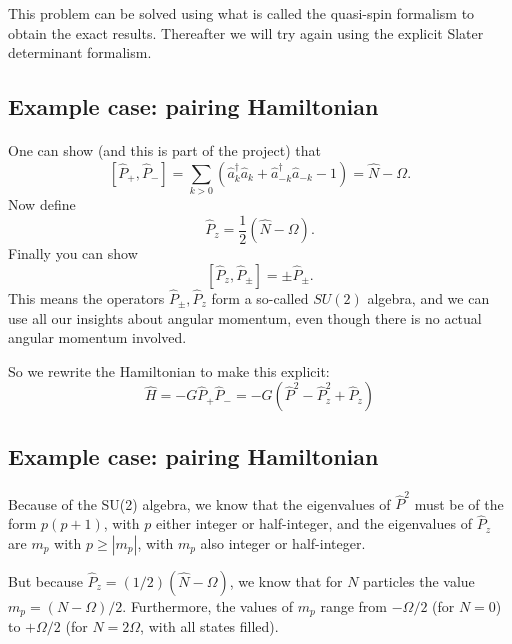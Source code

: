 This problem can be solved using what is called the quasi-spin formalism to obtain the 
exact results. Thereafter we will try again using the explicit Slater determinant formalism.



\subsection*{Example case: pairing Hamiltonian}

\paragraph{}

One can show (and this is part of the project) that
\[
\left [ \hat{P}_+, \hat{P}_- \right ] = \sum_{k> 0} \left( \hat{a}^\dagger_k \hat{a}_k 
+ \hat{a}^\dagger_{-{k}} \hat{a}_{-{k}} - 1 \right) = \hat{N} - \Omega.
\]
Now define 
\[
\hat{P}_z = \frac{1}{2} ( \hat{N} -\Omega).
\]
Finally you can show
\[
\left [ \hat{P}_z , \hat{P}_\pm \right ] = \pm \hat{P}_\pm.
\]
This means the operators $\hat{P}_\pm, \hat{P}_z$ form a so-called  $SU(2)$ algebra, and we can 
use all our insights about angular momentum, even though there is no actual 
angular momentum involved.

So we rewrite the Hamiltonian to make this explicit:
\[
\hat{H} = -G \hat{P}_+ \hat{P}_- 
= -G \left( \hat{P}^2 - \hat{P}_z^2 + \hat{P}_z\right)
\]



\subsection*{Example case: pairing Hamiltonian}

\paragraph{}

Because of the SU(2) algebra, we know that the eigenvalues of 
$\hat{P}^2$ must be of the form $p(p+1)$, with $p$ either integer or half-integer, and the eigenvalues of $\hat{P}_z$ 
are $m_p$ with $p \geq | m_p|$, with $m_p$ also integer or half-integer. 

But because $\hat{P}_z = (1/2)(\hat{N}-\Omega)$, we know that for $N$ particles 
the value $m_p = (N-\Omega)/2$. Furthermore, the values of $m_p$ range from 
$-\Omega/2$ (for $N=0$) to $+\Omega/2$ (for $N=2\Omega$, with all states filled). 

